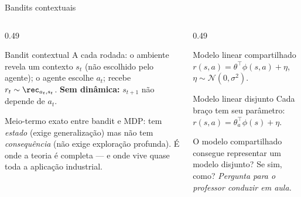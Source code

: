 \documentclass[aspectratio=169, 11pt]{beamer}
\newcommand{\paradiscussao}{\smallskip
  {\footnotesize\color{rlCinza}\itshape Pergunta para o professor conduzir em aula.}}
\newcommand{\feat}{\phi}
\begin{document}
\begin{frame}{Bandits contextuais}
  \begin{columns}[T]
    \begin{column}{0.49\textwidth}
      \begin{defbox}{Bandit contextual}
        A cada rodada: o ambiente revela um contexto $s_t$ (não escolhido pelo agente);
        o agente escolhe $a_t$; recebe $r_t \sim \rec_{a_t,s_t}$.
        \textbf{Sem dinâmica:} $s_{t+1}$ não depende de $a_t$.
      \end{defbox}
      \begin{ideiabox}
        Meio-termo exato entre bandit e MDP: tem \emph{estado} (exige generalização) mas
        não tem \emph{consequência} (não exige exploração profunda). É onde a teoria é
        completa --- e onde vive quase toda a aplicação industrial.
      \end{ideiabox}
    \end{column}
    \begin{column}{0.49\textwidth}
      \begin{teobox}{Modelo linear compartilhado}
        $r(s,a) = \theta^{\!\top} \feat(s,a) + \eta$, \; $\eta \sim \mathcal{N}(0,\sigma^{2})$.
      \end{teobox}
      \begin{teobox}{Modelo linear disjunto}
        Cada braço tem seu parâmetro: $r(s,a) = \theta_a^{\!\top} \feat(s) + \eta$.
      \end{teobox}
      \begin{quizbox}{}
        O modelo compartilhado consegue representar um modelo disjunto? Se sim, como?
        \paradiscussao
      \end{quizbox}
    \end{column}
  \end{columns}
\end{frame}
\end{document}
